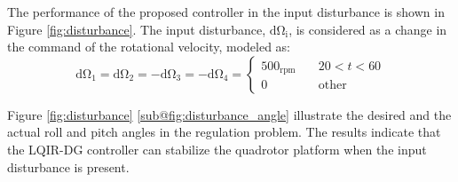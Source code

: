 \documentclass[3p,times]{elsarticle}
\begin{document}
\noindent The performance of the proposed controller in the input disturbance is shown in Figure \ref{fig:disturbance}. The input disturbance, $\mathrm{d\Omega_i}$, is considered as a change in the command of the rotational velocity, modeled as:
\begin{equation}
	\mathrm{d\Omega_1} = \mathrm{d\Omega_2} = -\mathrm{d\Omega_3} = -\mathrm{d\Omega_4} = \begin{cases}
		500_{\mathrm{rpm}} \quad &20<t<60\\
		0 \quad &\mathrm{other}
	\end{cases}
\end{equation}

Figure \ref{fig:disturbance} \ref{sub@fig:disturbance_angle} illustrate the desired and the actual roll and pitch angles in the regulation problem. The results indicate that the LQIR-DG controller can stabilize the quadrotor platform when the input disturbance is present.
\end{document}
